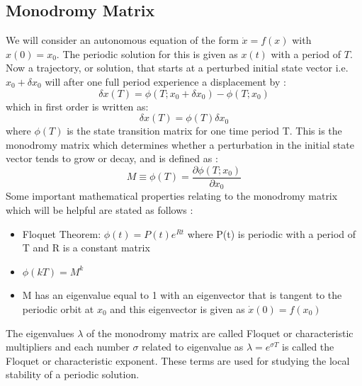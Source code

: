 \subsection{Monodromy Matrix}
We will consider an autonomous equation of the form $\dot{x} = f(x)$ with $x(0) = x_0$. The periodic solution for this is given as $x(t)$ with a period of $T$. Now a trajectory, or solution, that starts at a perturbed initial state vector i.e. $x_0 + \delta x_0$ will after one full period experience a displacement by \cite{invariant}:
\begin{equation}
\delta x(T) = \phi(T;x_0 + \delta x_0) - \phi(T; x_0)
\end{equation}
%
which in first order is written as:
\begin{equation}
\delta x(T) = \phi(T) \delta x_0
\end{equation}
%
where $\phi(T)$ is the state transition matrix for one time period T. This is the monodromy matrix which determines whether a perturbation in the initial state vector tends to grow or decay, and is defined as \cite{invariant}:
\begin{equation}
M \equiv \phi(T) = \frac{\partial \phi(T;x_0)}{\partial x_0}
\end{equation}
%
Some important mathematical properties relating to the monodromy matrix which will be helpful are stated as follows \cite{invariant}:
\begin{itemize}
\item Floquet Theorem: $\phi(t) = P(t) e^{Rt}$ where P(t) is periodic with a period of T and R is a constant matrix
\item $\phi(kT) = M^k$
\item M has an eigenvalue equal to 1 with an eigenvector that is tangent to the periodic orbit at $x_0$ and this eigenvector is given as $\dot{x}(0) = f(x_0)$
\end{itemize}
%
The eigenvalues $\lambda$ of the monodromy matrix are called Floquet or characteristic multipliers and each number $\sigma$ related to eigenvalue as $\lambda = e^{\sigma T}$ is called the Floquet or characteristic exponent. These terms are used for studying the local stability of a periodic solution.


